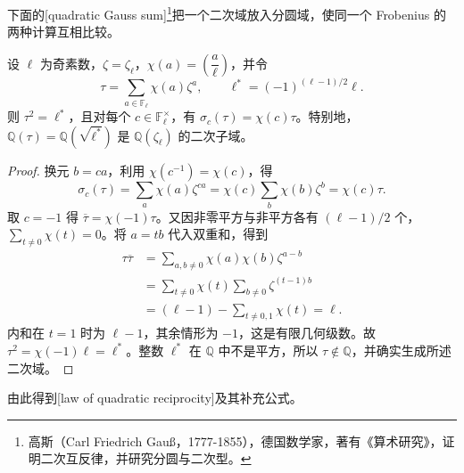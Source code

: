 下面的[quadratic Gauss sum]\footnote{高斯（Carl Friedrich Gauß，1777-1855），德国数学家，著有《算术研究》，证明二次互反律，并研究分圆与二次型。}把一个二次域放入分圆域，使同一个 Frobenius 的两种计算互相比较。

\begin{lemma}\label{b3:lem:quadratic-gauss-sum}
	设 \(\ell\) 为奇素数，\(\zeta=\zeta_\ell\)，\(\chi(a)=\left(\dfrac a\ell\right)\)，并令
	\[
		\tau=\sum_{a\in\mathbb F_\ell}\chi(a)\zeta^a,\qquad
		\ell^*=(-1)^{(\ell-1)/2}\ell.
	\]
	则 \(\tau^2=\ell^*\)，且对每个 \(c\in\mathbb F_\ell^\times\)，有 \(\sigma_c(\tau)=\chi(c)\tau\)。特别地，\(\mathbb Q(\tau)=\mathbb Q(\sqrt{\ell^*})\) 是 \(\mathbb Q(\zeta_\ell)\) 的二次子域。
\end{lemma}
\begin{proof}
	换元 \(b=ca\)，利用 \(\chi(c^{-1})=\chi(c)\)，得
	\[
		\sigma_c(\tau)=\sum_a\chi(a)\zeta^{ca}
		=\chi(c)\sum_b\chi(b)\zeta^b=\chi(c)\tau.
	\]
	取 \(c=-1\) 得 \(\overline\tau=\chi(-1)\tau\)。又因非零平方与非平方各有 \((\ell-1)/2\) 个，\(\sum_{t\ne0}\chi(t)=0\)。将 \(a=tb\) 代入双重和，得到
	\[
		\begin{aligned}
			\tau\overline\tau
			&=\sum_{a,b\ne0}\chi(a)\chi(b)\zeta^{a-b}\\
			&=\sum_{t\ne0}\chi(t)\sum_{b\ne0}\zeta^{(t-1)b}\\
			&=(\ell-1)-\sum_{t\ne0,1}\chi(t)=\ell.
		\end{aligned}
	\]
	内和在 \(t=1\) 时为 \(\ell-1\)，其余情形为 \(-1\)，这是有限几何级数。故 \(\tau^2=\chi(-1)\ell=\ell^*\)。整数 \(\ell^*\) 在 \(\mathbb Q\) 中不是平方，所以 \(\tau\notin\mathbb Q\)，并确实生成所述二次域。
\end{proof}

由此得到[law of quadratic reciprocity]及其补充公式。

